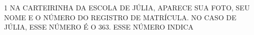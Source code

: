 






\num{1} NA CARTEIRINHA DA ESCOLA DE JÚLIA, APARECE SUA FOTO, SEU NOME E O NÚMERO DO
REGISTRO DE MATRÍCULA. NO CASO DE JÚLIA, ESSE NÚMERO É O 363. ESSE NÚMERO INDICA

